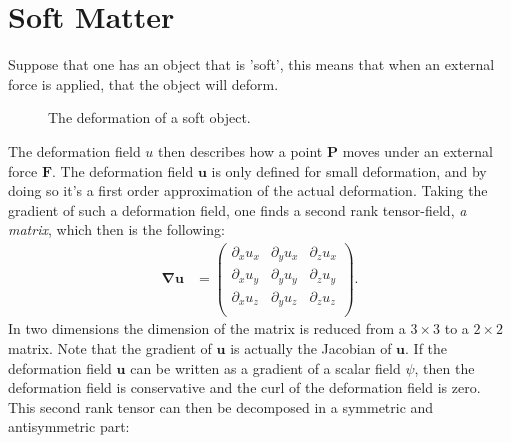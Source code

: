 \documentclass[a4paper]{article}
\newcommand{\grad}{\mathbf{\nabla}}
\begin{document}
\section{Soft Matter}\label{sec: Soft matter}
Suppose that one has an object that is 'soft', this means that when an external force is applied, that the object will deform.
\begin{figure}[H]
    \centering
    \caption{The deformation of a soft object.}
    \label{fig: soft object deformation derivation}
\end{figure}\noindent
The deformation field $u$ then describes how a point $\mathbf{P}$ moves under an external force $\mathbf{F}$. The deformation field $\mathbf{u}$ is only defined for small deformation, and by doing so it's a first order approximation of the actual deformation.
Taking the gradient of such a deformation field, one finds a second rank tensor-field, \textit{a matrix}, which then is the following:
\begin{align*}
    \grad{\mathbf{u}} &= \begin{pmatrix}
        \partial_x u_x & \partial_y u_x & \partial_z u_x\\
        \partial_x u_y & \partial_y u_y & \partial_z u_y\\
        \partial_x u_z & \partial_y u_z & \partial_z u_z\\
    \end{pmatrix}.
\end{align*}In two dimensions the dimension of the matrix is reduced from a $3\times 3$ to a $2\times 2$ matrix. Note that the gradient of $\mathbf{u}$ is actually the Jacobian of $\mathbf{u}$. If the deformation field $\mathbf{u}$ can be written as a gradient of a scalar field $\psi$, then the deformation field is conservative and the curl of the deformation field is zero.
This second rank tensor can then be decomposed in a symmetric and antisymmetric part:
\end{document}
